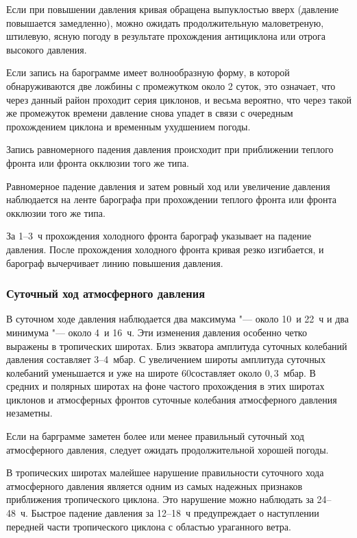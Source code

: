  Если при повышении давления кривая обращена выпуклостью вверх
(давление повышается замедленно), можно ожидать продолжительную
маловетреную, штилевую, ясную погоду в результате прохождения
антициклона или отрога высокого давления.

 Если запись на барограмме имеет волнообразную форму, в которой
обнаруживаются две ложбины с промежутком около 2 суток, это означает,
что через данный район проходит серия циклонов, и весьма вероятно, что
через такой же промежуток времени давление снова упадет в связи с
очередным прохождением циклона и временным ухудшением погоды.

 Запись равномерного падения давления происходит при
приближении теплого фронта или фронта окклюзии того же типа.

 Равномерное падение давления и затем ровный ход или увеличение
давления наблюдается на ленте барографа при прохождении теплого фронта
или фронта окклюзии того же типа.

 За 1--3~ч прохождения холодного фронта барограф указывает на
падение давления. После прохождения холодного фронта кривая резко
изгибается, и барограф вычерчивает линию повышения давления.

\subsubsection{Суточный ход атмосферного давления}

В суточном ходе давления наблюдается два максимума "--- около 10~и 22~ч и
два минимума "--- около 4~и 16~ч. Эти изменения давления особенно четко
выражены в тропических широтах. Близ экватора амплитуда суточных
колебаний давления составляет 3--4~мбар. С увеличением широты амплитуда
суточных колебаний уменьшается и уже на широте 60\gr составляет около
$0,3$~мбар. В средних и полярных широтах на фоне частого прохождения в
этих широтах циклонов и атмосферных фронтов суточные колебания
атмосферного давления незаметны.

 Если на барграмме заметен более или менее правильный суточный
ход атмосферного давления, следует ожидать продолжительной хорошей
погоды.

 В тропических широтах малейшее нарушение правильности
суточного хода атмосферного давления является одним из самых надежных
признаков приближения тропического циклона. Это нарушение можно
наблюдать за 24--48~ч. Быстрое падение давления за 12--18~ч
предупреждает о наступлении передней части тропического циклона с
областью ураганного ветра.

